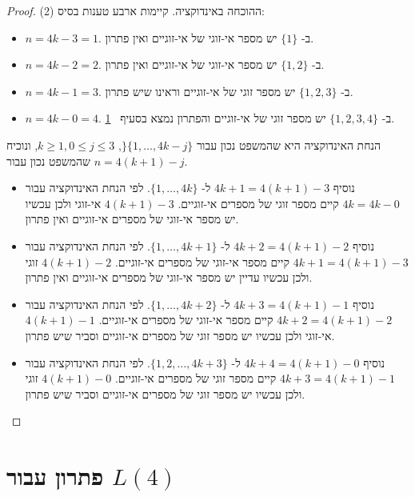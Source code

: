 \begin{proof}(2)
ההוכחה באינדוקציה. קיימות ארבע טענות בסיס:
\begin{itemize}
\item $n=4k-3=1$.
ב-%
$\{1\}$
יש מספר אי-זוגי של אי-זוגיים ואין פתרון.
\item $n=4k-2=2$.
ב-%
$\{1,2\}$
יש מספר אי-זוגי של אי-זוגיים ואין פתרון.
\item $n=4k-1=3$.
ב-%
$\{1,2,3\}$
יש מספר זוגי של אי-זוגיים וראינו שיש פתרון.
\item $n=4k-0=4$.
ב-%
$\{1,2,3,4\}$
יש מספר זוגי של אי-זוגיים והפתרון נמצא בסעיף%
~\ref{s.langford-four}.
\end{itemize}
הנחת האינדוקציה היא שהמשפט נכון עבור 
$\}\{1,\ldots,4k-j\}$,
$k\geq 1, 0\leq j\leq 3$,
ונוכיח שהמשפט נכון עבור
$n=4(k+1)-j$.
\begin{itemize}
\item
נוסיף
$4k+1=4(k+1)-3$
ל-%
$\{1,\ldots,4k\}$. 
לפי הנחת האינדוקציה עבור
$4k=4k-0$ 
קיים מספר זוגי של מספרים אי-זוגיים.
$4(k+1)-3$
אי-זוגי ולכן עכשיו יש מספר אי-זוגי של מספרים אי-זוגיים ואין פתרון.
\item 
נוסיף
$4k+2=4(k+1)-2$
ל-%
$\{1,\ldots,4k+1\}$.
לפי הנחת האינדוקציה עבור
$4k+1=4(k+1)-3$
קיים מספר אי-זוגי של מספרים אי-זוגיים.
$4(k+1)-2$
זוגי ולכן עכשיו עדיין יש מספר אי-זוגי של מספרים אי-זוגיים ואין פתרון.
\item 
נוסיף
$4k+3=4(k+1)-1$
ל-%
$\{1,\ldots,4k+2\}$.
לפי הנחת האינדוקציה עבור
$4k+2=4(k+1)-2$
קיים מספר אי-זוגי של מספרים אי-זוגיים.
$4(k+1)-1$
אי-זוגי ולכן עכשיו יש מספר זוגי של מספרים אי-זוגיים וסביר שיש פתרון.
\item 
נוסיף
$4k+4=4(k+1)-0$
ל-%
$\{1,2,\ldots,4k+3\}$.
לפי הנחת האינדוקציה עבור
$4k+3=4(k+1)-1$
קיים מספר זוגי של מספרים אי-זוגיים.
$4(k+1)-0$
זוגי ולכן עכשיו יש מספר זוגי של מספרים אי-זוגיים וסביר שיש פתרון.
\end{itemize}
\end{proof}


\newpage

\section{פתרון עבור
$L(4)$}\label{s.langford-four}

